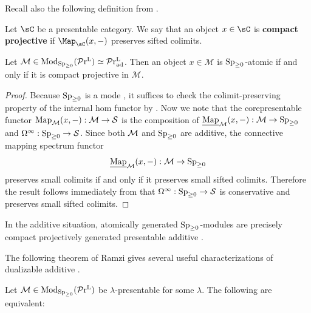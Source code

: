 \documentclass[a4paper,10pt, oneside]{amsart}
\begin{document}
Recall also the following definition from \cite{htt}. 	
\begin{de}
Let $\sC$ be a presentable category. We say that an object $x\in \sC$ is {\bf compact projective} if 
$\Map_{\sC}(x,-)$ preserves sifted colimits. 
\end{de}

	
	\begin{prop}\label{atcproj}
		Let $\mathcal{M}\in\operatorname{Mod}_{\operatorname{Sp}_{\geq0}}(\mathcal{P}\mathrm{r}^\mathrm{L})\simeq\mathcal{P}\mathrm{r}_{\mathrm{ad}}^\mathrm{L}$. Then an object 
		$x \in \mathcal{M}$ is $\operatorname{Sp}_{\geq0}$-atomic if and only if it is compact projective in $\mathcal{M}$.
	\end{prop}
	
	\begin{proof}
		Because $\operatorname{Sp}_{\geq0}$ is a mode \cite[see][]{carmeli2021ambidexterity}, it suffices to check the colimit-preserving property of the internal hom functor by \cite[Example 1.24]{ramzi2024dualizable}. Now we note that the corepresentable functor $\operatorname{Map}_{\mathcal{M}}(x,-): \mathcal{M} \rightarrow \mathcal{S}$ is the composition of  $\underline{\operatorname{Map}}_{\mathcal{M}}(x,-): \mathcal{M} \rightarrow \operatorname{Sp}_{\geq0}$ and $\Omega^{\infty}:\operatorname{Sp}_{\geq0} \rightarrow \mathcal{S}$. Since both $\mathcal{M}$ and $\operatorname{Sp}_{\geq0}$ are additive, the connective mapping spectrum functor $$\underline{\operatorname{Map}}_{\mathcal{M}}(x,-): \mathcal{M} \rightarrow \operatorname{Sp}_{\geq0}$$ preserves small colimits if and only if it preserves small sifted colimits. Therefore the result follows immediately from  \textup{\cite[ Proposition 1.4.3.9]{ha}} that $\Omega^{\infty}:\operatorname{Sp}_{\geq0} \rightarrow \mathcal{S}$ is conservative and preserves small sifted colimits.
	\end{proof}
	
	\begin{rem}
		In the additive situation, atomically generated $\operatorname{Sp}_{\geq0}$-modules are precisely compact projectively generated presentable additive \infcats. 
	\end{rem}
	The following theorem of Ramzi gives several useful characterizations of dualizable additive \infcats.
	\begin{thm}\label{ram149}
		Let $\mathcal{M} \in \operatorname{Mod}_{\operatorname{Sp}_{\geq0}}(\mathcal{P}\mathrm{r}^\mathrm{L})$ be $\lambda$-presentable for some $\lambda$. The following are equivalent:
	\end{thm}
\end{document}
